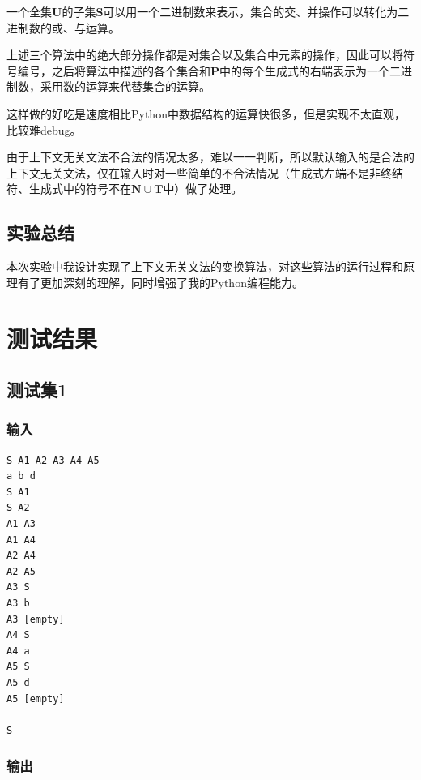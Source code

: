 \documentclass[lang=cn,11pt,a4paper,cite=authornum]{paper}
\begin{document}
一个全集$\mathbf U$的子集$\mathbf S$可以用一个二进制数来表示，集合的交、并操作可以转化为二进制数的或、与运算。

上述三个算法中的绝大部分操作都是对集合以及集合中元素的操作，因此可以将符号编号，之后将算法中描述的各个集合和$\mathbf P$中的每个生成式的右端表示为一个二进制数，采用数的运算来代替集合的运算。

这样做的好吃是速度相比Python中数据结构的运算快很多，但是实现不太直观，比较难debug。

由于上下文无关文法不合法的情况太多，难以一一判断，所以默认输入的是合法的上下文无关文法，仅在输入时对一些简单的不合法情况（生成式左端不是非终结符、生成式中的符号不在$\mathbf N\cup\mathbf T$中）做了处理。

\subsection{实验总结}

本次实验中我设计实现了上下文无关文法的变换算法，对这些算法的运行过程和原理有了更加深刻的理解，同时增强了我的Python编程能力。

\section{测试结果}

\subsection{测试集1}

\subsubsection{输入}

\begin{code}
\begin{verbatim}
S A1 A2 A3 A4 A5
a b d
S A1
S A2
A1 A3
A1 A4
A2 A4
A2 A5
A3 S
A3 b
A3 [empty]
A4 S
A4 a
A5 S
A5 d
A5 [empty]

S
\end{verbatim}
\end{code}

\subsubsection{输出}
\end{document}

